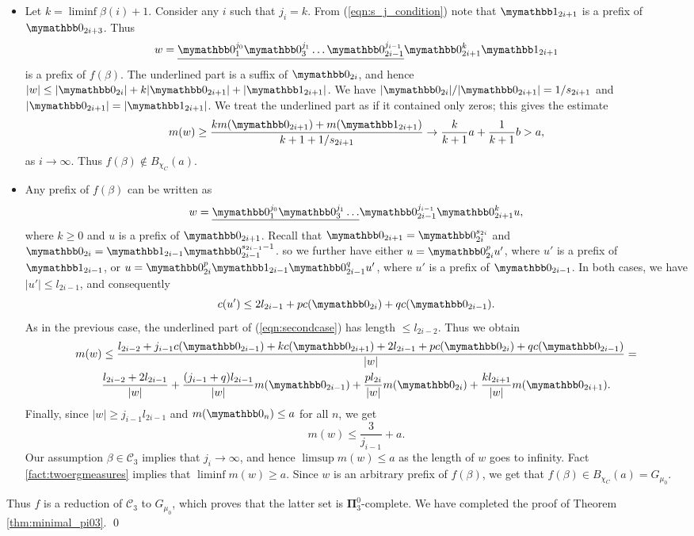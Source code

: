 \documentclass{amsart}
\theoremstyle{definition}
\newcommand{\bP}{\boldsymbol{\Pi}}
\begin{document}
\begin{itemize}
	\item[$\beta \not \in \mathcal{C}_3$:]
		Let $k = \liminf \beta(i) + 1$. Consider any $i$ such that $j_i = k$.
		From (\ref{eqn:s_j_condition}) note that $\one_{2i + 1}$ is a prefix of $\zero_{2i+3}$. Thus
		$$
			w =  \underline{\zero_1^{j_0} \zero_3^{j_1} \dots \zero_{2i-1}^{j_{i-1}}} \zero_{2i+1}^{k} \one_{2i + 1}
		$$
		is a prefix of $f(\beta)$. The underlined part is a suffix of $\zero_{2i}$,
		and hence $|w| \le |\zero_{2i}| + k |\zero_{2i+1}| + |\one_{2i+1}|$.
		We have $|\zero_{2i}| / |\zero_{2i+1}| = 1/s_{2i+1}$ and $ |\zero_{2i+1}| = |\one_{2i+1}|$.
		We treat the underlined part as if it contained only zeros; this gives the estimate
		$$
			m(w) \ge \frac{k m(\zero_{2i+1}) + m(\one_{2i+1})}{k + 1 + 1/s_{2i+1}}
			\to
			\frac{k}{k+1} a + \frac{1}{k+1} b > a,
		$$
		as $i \to \infty$. Thus $f(\beta) \not \in B_{\chi_C}(a)$.
	\item[$\beta \in \mathcal{C}_3$:] Any prefix of $f(\beta)$ can be written as
		\begin{equation} \label{eqn:secondcase}
			w =  \underline{\zero_1^{j_0} \zero_3^{j_1} \dots} \zero_{2i-1}^{j_{i-1}} \zero_{2i+1}^{k} u,
		\end{equation}
		where $k \ge 0$ and $u$ is a prefix of $\zero_{2i+1}$.
		Recall that
		$\zero_{2i+1} = \zero_{2i}^{s_{2i}}$ and $ \zero_{2i} = \one_{2i-1} \zero_{2i-1}^{s_{2i - 1} - 1}$.
		so we further have either
		$u = \zero_{2i}^p u'$, where $u'$ is a prefix of $\one_{2i-1}$,
		or $u = \zero_{2i}^p \one_{2i-1} \zero_{2i-1}^q u'$, where $u'$ is a prefix of $\zero_{2i-1}$.
		In both cases, we have $|u'| \le l_{2i-1}$, and consequently
		\begin{equation*}
			c(u') \le 2 l_{2i-1} + p c(\zero_{2i}) + q c(\zero_{2i-1}).
		\end{equation*}
		As in the previous case, the underlined part of (\ref{eqn:secondcase}) has length $\le l_{2i-2}$.
		Thus we obtain
		\begin{multline*}
			m(w) \le
			\frac{  l_{2i-2} + j_{i-1} c(\zero_{2i-1}) + k c(\zero_{2i+1}) + 2 l_{2i-1} + p c(\zero_{2i}) + q c(\zero_{2i-1})}
			{|w|} = \\
			\frac{l_{2i-2} + 2l_{2i-1}}{|w|} +
			\frac{(j_{i-1} + q) l_{2i-1}}{|w|} m(\zero_{2i - 1}) +
			\frac{p l_{2i}}{|w|} m(\zero_{2i}) +
			\frac{k l_{2i+1}}{|w|} m(\zero_{2i + 1}).
		\end{multline*}
		Finally, since $|w| \ge j_{i-1} l_{2i-1}$ and $m(\zero_n) \le a$ for all $n$, we get
		\begin{equation*}
			m(w) \le \frac{3}{j_{i-1}} + a.
		\end{equation*}
		Our assumption $\beta \in \mathcal{C}_3$ implies that $j_i \to \infty$, and hence
		$\limsup m(w) \le a$ as the length of $w$ goes to infinity.
		Fact \ref{fact:twoergmeasures} implies that $\liminf m(w) \ge a$.
		Since $w$ is an arbitrary prefix of $f(\beta)$, we get that $f(\beta) \in B_{\chi_C}(a) = G_{\mu_0}$.
\end{itemize}
Thus $f$ is a reduction of $\mathcal{C}_3$ to $G_{\mu_0}$, which proves that the latter set is $\bP_3^0$-complete. We have completed the proof of Theorem \ref{thm:minimal_pi03}. \qed
\end{document}
